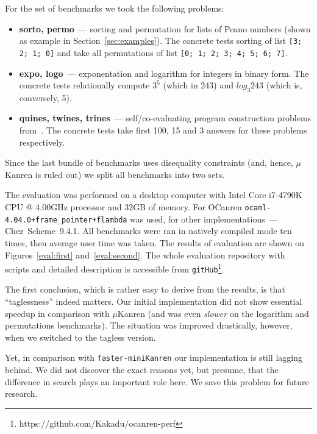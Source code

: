 For the set of benchmarks we took the following problems:

\begin{itemize}
\item \textbf{sorto, permo}~--- sorting and permutation for lists of Peano numbers (shown as example in Section~\ref{sec:examples}).
The concrete tests sorting of list \lstinline{[3; 2; 1; 0]} and take all permutations of list \lstinline{[0; 1; 2; 3; 4; 5; 6; 7]}.
\item \textbf{expo, logo}~--- exponentation and logarithm for integers in binary form. The concrete tests relationally compute
$3^5$ (which in 243) and $log_3 243$ (which is, conversely, 5).
\item \textbf{quines, twines, trines}~--- self/co-evaluating program construction problems from~\cite{Untagged}. The
concrete tests take first 100, 15 and 3 answers for these problems respectively.
\end{itemize}

Since the last bundle of benchmarks uses disequality constraints (and, hence, $\mu$Kanren is ruled out) we
split all benchmarks into two sets.

The evaluation was performed on a desktop computer with Intel Core i7-4790K CPU @ 4.00GHz processor and 32GB of memory.
For OCanren \mbox{\texttt{ocaml-4.04.0+frame_pointer+flambda}} was used, for other implementations~--- Chez~Scheme~9.4.1.
All benchmarks were ran in natively compiled mode ten times, then average user time was taken. The results of evaluation
are shown on Figures~\ref{eval:first} and~\ref{eval:second}. The whole evaluation repository with scripts and detailed
description is accessible from \lstinline{gitHub}\footnote{https://github.com/Kakadu/ocanren-perf}.

The first conclusion, which is rather easy to derive from the results, is that ``taglessness'' indeed matters. Our initial
implementation did not show essential speedup in comparison with $\mu$Kanren (and was even \emph{slower} on the logarithm
and permutations benchmarks). The situation was improved drastically, however, when we switched to the tagless version.

Yet, in comparison with \texttt{faster-miniKanren} our implementation is still lagging behind. We did not discover the exact
reasons yet, but presume, that the difference in search plays an important role here.
We save this problem for future research.
